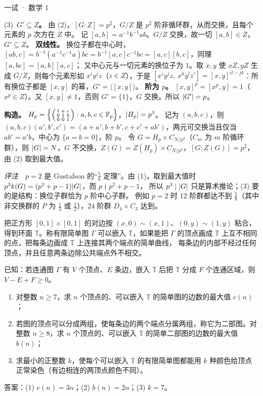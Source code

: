 \documentclass[cjk=noto, seal=first]{mojing-exam}
\begin{document}
\begin{paper}[time={建议 3 小时（训练设置）}, full=150]{一试 · 数学 1}
\begin{questions}
\begin{solution}
(3)~\textbf{$G'\subseteq Z$。} 由 (2)，$[G:Z]=p^2$，$G/Z$ 是 $p^2$ 阶非循环群，从而交换，且每个元素的 $p$ 次方在 $Z$ 中。
记 $[a,b]=a^{-1}b^{-1}ab$。$G/Z$ 交换，故一切 $[a,b]\in Z$，$G'\subseteq Z$。
\textbf{双线性。} 换位子都在中心时，$[ab,c]=b^{-1}(a^{-1}c^{-1}a)bc=b^{-1}[a,c]c^{-1}bc=[a,c][b,c]$，同理 $[a,bc]=[a,b][a,c]$；
又中心元与一切元素的换位子为 $1$。取 $x,y$ 使 $xZ,yZ$ 生成 $G/Z$，则每个元素形如 $x^iy^jz$（$z\in Z$），于是
$[x^iy^jz,\ x^ky^lz']=[x,y]^{il-jk}$：所有换位子都是 $[x,y]$ 的幂，$G'=\langle[x,y]\rangle$。
\textbf{阶为 $p$。} $[x,y]^p=[x^p,y]=1$（$x^p\in Z$）。又 $[x,y]\ne1$，否则 $G'=\{1\}$，$G$ 交换。所以 $\lvert G'\rvert=p$。

\textbf{构造。} $H_p=\Bigl\{\begin{psmallmatrix}1&a&c\\0&1&b\\0&0&1\end{psmallmatrix}:a,b,c\in\mathbb{F}_p\Bigr\}$，$\lvert H_p\rvert=p^3$。
记为 $(a,b,c)$，则 $(a,b,c)(a',b',c')=(a+a',b+b',c+c'+ab')$，两元可交换当且仅当 $ab'=a'b$，中心为 $\{a=b=0\}$，阶 $p$。
令 $G=H_p\times C_{N/p^3}$（$C_m$ 为 $m$ 阶循环群），则 $\lvert G\rvert=N$，$G$ 不交换，$Z(G)=Z(H_p)\times C_{N/p^3}$，$[G:Z(G)]=p^2$，
由 (2) 取到最大值。

\emph{评注}　$p=2$ 是 Gustafson 的“$\frac58$ 定理”。由 (1)，取到最大值时 $p^3k(G)=(p^2+p-1)\lvert G\rvert$，而 $p\nmid p^2+p-1$，
所以 $p^3\mid\lvert G\rvert$ 只是算术推论；(3) 要的是结构：换位子群恰为 $p$ 阶中心子群。
例如 $p=2$ 时 $12$ 阶群都达不到 $\frac58$（其中非交换群的 $P$ 为 $\frac13$ 或 $\frac12$），$24$ 阶群 $D_4\times C_3$ 达到。
\end{solution}

\question[30]
把正方形 $[0,1]\times[0,1]$ 的对边按 $(x,0)\sim(x,1)$、$(0,y)\sim(1,y)$ 粘合，得到环面 $\mathbb T$。称有限简单图 $\Gamma$
可以嵌入 $\mathbb T$，如果能把 $\Gamma$ 的顶点画成 $\mathbb T$ 上互不相同的点，把每条边画成 $\mathbb T$ 上连接其两个端点的简单曲线，
每条边的内部不经过任何顶点，并且任意两条边除公共端点外不相交。

已知：若连通图 $\Gamma$ 有 $V$ 个顶点、$E$ 条边，嵌入 $\mathbb T$ 后把 $\mathbb T$ 分成 $F$ 个连通区域，则 $V-E+F\ge0$。
\begin{enumerate}
  \item 对整数 $n\ge7$，求 $n$ 个顶点的、可以嵌入 $\mathbb T$ 的简单图的边数的最大值 $e(n)$；
  \item 若图的顶点可以分成两组，使每条边的两个端点分属两组，称它为二部图。对整数 $n\ge8$，求 $n$ 个顶点的、可以嵌入 $\mathbb T$
        的简单二部图的边数的最大值 $b(n)$；
  \item 求最小的正整数 $k$，使每个可以嵌入 $\mathbb T$ 的有限简单图都能用 $k$ 种颜色给顶点正常染色（有边相连的两顶点颜色不同）。
\end{enumerate}
\answerspace{2cm}
\begin{solution}
答案：(1) $e(n)=3n$；(2) $b(n)=2n$；(3) $k=7$。


\end{solution}
\end{questions}
\end{paper}
\end{document}
